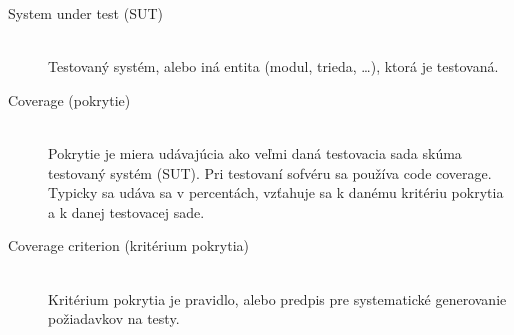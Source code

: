 \begin{description}
	\item[System under test (SUT)] \hfill \\
		Testovaný systém, alebo iná entita (modul, trieda, \dots), ktorá je testovaná.

	\item[Coverage (pokrytie)] \hfill \\
		Pokrytie je miera udávajúcia ako veľmi daná testovacia sada skúma testovaný systém (SUT). Pri testovaní sofvéru sa používa code coverage. Typicky sa udáva sa v percentách, vzťahuje sa k danému kritériu pokrytia a k danej testovacej sade.

	\item[Coverage criterion (kritérium pokrytia)] \hfill \\
		Kritérium pokrytia je pravidlo, alebo predpis pre systematické generovanie požiadavkov na testy.
\end{description}

